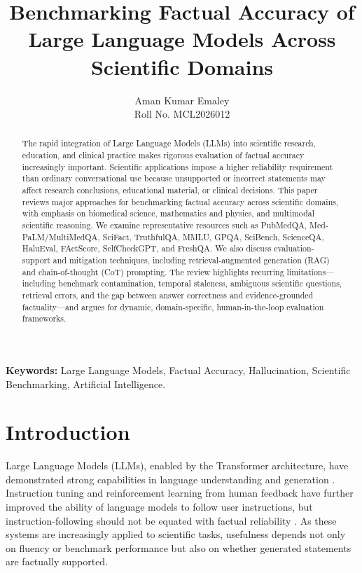 \documentclass[10pt,a4paper]{article}
\title{Benchmarking Factual Accuracy of Large Language Models Across Scientific Domains}
\author{Aman Kumar Emaley\\Roll No. MCL2026012}
\date{}
\begin{document}
\maketitle

\begin{abstract}\small
The rapid integration of Large Language Models (LLMs) into scientific research, education, and clinical practice makes rigorous evaluation of factual accuracy increasingly important. Scientific applications impose a higher reliability requirement than ordinary conversational use because unsupported or incorrect statements may affect research conclusions, educational material, or clinical decisions. This paper reviews major approaches for benchmarking factual accuracy across scientific domains, with emphasis on biomedical science, mathematics and physics, and multimodal scientific reasoning. We examine representative resources such as PubMedQA, Med-PaLM/MultiMedQA, SciFact, TruthfulQA, MMLU, GPQA, SciBench, ScienceQA, HaluEval, FActScore, SelfCheckGPT, and FreshQA. We also discuss evaluation-support and mitigation techniques, including retrieval-augmented generation (RAG) and chain-of-thought (CoT) prompting. The review highlights recurring limitations---including benchmark contamination, temporal staleness, ambiguous scientific questions, retrieval errors, and the gap between answer correctness and evidence-grounded factuality---and argues for dynamic, domain-specific, human-in-the-loop evaluation frameworks.
\end{abstract}

\vspace{0.15em}
\noindent\small\textbf{Keywords:} Large Language Models, Factual Accuracy, Hallucination, Scientific Benchmarking, Artificial Intelligence.
\normalsize

\section{Introduction}\label{sec:introduction}

Large Language Models (LLMs), enabled by the Transformer architecture, have demonstrated strong capabilities in language understanding and generation \cite{vaswani2017attention,brown2020language}. Instruction tuning and reinforcement learning from human feedback have further improved the ability of language models to follow user instructions, but instruction-following should not be equated with factual reliability \cite{ouyang2022training}. As these systems are increasingly applied to scientific tasks, usefulness depends not only on fluency or benchmark performance but also on whether generated statements are factually supported.
\end{document}
